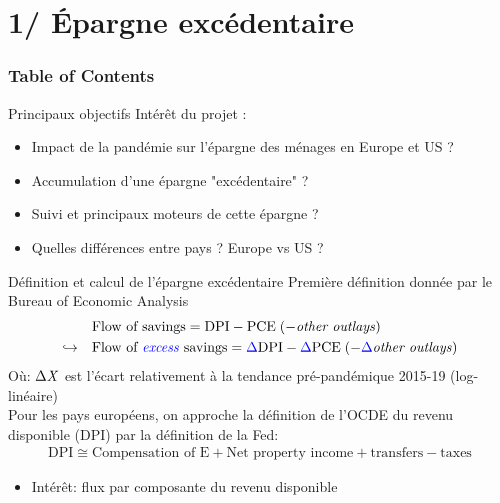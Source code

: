\documentclass[9pt, xcolor={dvipsnames}]{beamer}
\newcommand{\blue}[1]{\textcolor{blue}{#1}}
\begin{document}
\section{1/ Épargne excédentaire}
\begin{frame}
  \frametitle{Table of Contents}
  \tableofcontents[currentsection]
\end{frame}
\begin{frame}{Principaux objectifs}
  Intérêt du projet :
  \begin{itemize}
    \item Impact de la pandémie sur l'épargne des ménages en Europe et US ? 
    \item Accumulation d'une épargne "excédentaire" ? 
    \item Suivi et principaux moteurs de cette épargne ? 
    \item Quelles différences entre pays ? Europe vs US ?
  \end{itemize}
\end{frame}

\begin{frame}{Définition et calcul de l'épargne excédentaire}
  Première définition donnée par le Bureau of Economic Analysis
  \begin{align*}
    &\textrm{Flow of savings} = \textrm{DPI} - \textrm{PCE} \; (- \textrm{\textit{other outlays}}) \\
    \hookrightarrow \quad &\textrm{Flow of \blue{\textit{excess}} savings} = \blue{\Delta} \textrm{DPI} - \blue{\Delta} \textrm{PCE} \; (- \blue{\Delta} \textrm{\textit{other outlays}})
  \end{align*}
  Où: $\Delta \textrm{\textit{X}}$ est l'écart relativement à la tendance pré-pandémique 2015-19 (log-linéaire) \\ 
  \vspace{.3cm}
  Pour les pays européens, on approche la définition de l'OCDE du revenu disponible (DPI) par la définition de la Fed:
  \begin{align*}
    \textrm{DPI} \cong  \textrm{Compensation of E} + \textrm{Net property income} + \textrm{transfers} - \textrm{taxes}
  \end{align*}
  \begin{itemize}
    \item Intérêt: flux par composante du revenu disponible
  \end{itemize}
\end{frame}
\end{document}

